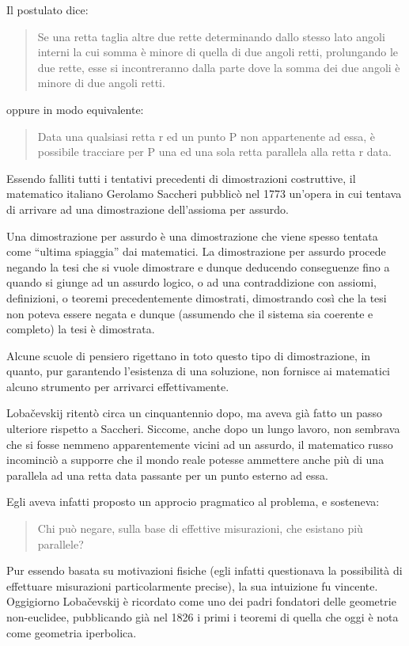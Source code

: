 \documentclass[a4paper,10pt]{article}
\begin{document}
Il postulato dice: \cite{wp-elementi-euclide}
\begin{quote}
 Se una retta taglia altre due rette determinando dallo stesso lato angoli interni la cui somma è minore di quella di due angoli retti, prolungando le due rette, esse si incontreranno dalla parte dove la somma dei due angoli è minore di due angoli retti.
\end{quote}
oppure in modo equivalente:
\begin{quote}
 Data una qualsiasi retta r ed un punto P non appartenente ad essa, è possibile tracciare per P una ed una sola retta parallela alla retta r data.
\end{quote}

Essendo falliti tutti i tentativi precedenti di dimostrazioni costruttive, il matematico italiano Gerolamo Saccheri pubblicò nel 1773 un'opera in cui tentava di arrivare ad una dimostrazione dell'assioma per assurdo.

Una dimostrazione per assurdo è una dimostrazione che viene spesso tentata come “ultima spiaggia” dai matematici. La dimostrazione per assurdo procede negando la tesi che si vuole dimostrare e dunque deducendo conseguenze fino a quando si giunge ad un assurdo logico, o ad una contraddizione con assiomi, definizioni, o teoremi precedentemente dimostrati, dimostrando così che la tesi non poteva essere negata e dunque (assumendo che il sistema sia coerente e completo) la tesi è dimostrata.

Alcune scuole di pensiero rigettano in toto questo tipo di dimostrazione, in quanto, pur garantendo l'esistenza di una soluzione, non fornisce ai matematici alcuno strumento per arrivarci effettivamente.

Lobačevskij ritentò circa un cinquantennio dopo, ma aveva già fatto un passo ulteriore rispetto a Saccheri. Siccome, anche dopo un lungo lavoro, non sembrava che si fosse nemmeno apparentemente vicini ad un assurdo, il matematico russo incominciò a supporre che il mondo reale potesse ammettere anche più di una parallela ad una retta data passante per un punto esterno ad essa.

Egli aveva infatti proposto un approcio pragmatico al problema, e sosteneva:
\begin{quote}
Chi può negare, sulla base di effettive misurazioni, che esistano più parallele?
\end{quote}
Pur essendo basata su motivazioni fisiche (egli infatti questionava la possibilità di effettuare misurazioni particolarmente precise), la sua intuizione fu vincente. Oggigiorno Lobačevskij è ricordato come uno dei padri fondatori delle geometrie non-euclidee, pubblicando già nel 1826 i primi i teoremi di quella che oggi è nota come geometria iperbolica. \nocite{wp-geometria-iperbolica}
\end{document}
